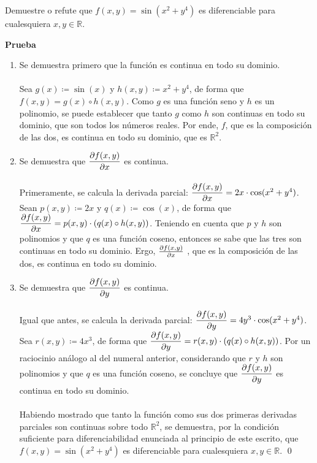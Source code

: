 \documentclass{fmbvecto}
\begin{document}
\begin{problema}

Demuestre o refute que \(f(x, y) = \sin(x^2+y^4)\) es diferenciable para cualesquiera \(x, y \in \mathbb{R}\).

\tcblower

\textbf{Prueba}\\

\begin{enumerate}
    \item Se demuestra primero que la función es continua en todo su dominio. \\\\ Sea \(g(x) \coloneqq \sin(x)\) y \(h(x, y) \coloneqq x^2+y^4\), de forma que \(f(x, y) = g(x) \circ h(x, y)\). Como \(g\) es una función seno y \(h\) es un polinomio, se puede establecer que tanto \(g\) como \(h\) son continuas en todo su dominio, que son todos los números reales. Por ende, \(f\), que es la composición de las dos, es continua en todo su dominio, que es \(\mathbb{R}^2\).\\
    
    \item Se demuestra que \(\dparder[f(x, y)]\) es continua. \\\\ Primeramente, se calcula la derivada parcial: \(\dparder[f(x, y)] = 2x \cdot \cos(x^2+y^4)\). Sean \(p(x, y) \coloneqq 2x\) y \(q(x) \coloneqq \cos(x)\), de forma que \(\dparder[f(x, y)] = p(x, y) \cdot (q(x) \circ h(x, y)) \). Teniendo en cuenta que \(p\) y \(h\) son polinomios y que \(q\) es una función coseno, entonces se sabe que las tres son continuas en todo su dominio. Ergo, \(\parder[f(x, y)]\) , que es la composición de las dos, es continua en todo su dominio.\\
    
    \item Se demuestra que \(\dparder[f(x, y)][y]\) es continua. \\\\  Igual que antes, se calcula la derivada parcial: \(\dparder[f(x, y)][y] = 4y^3 \cdot \cos(x^2+y^4)\). Sea \(r(x, y) \coloneqq 4x^3\), de forma que \(\dparder[f(x, y)][y] = r(x, y) \cdot (q(x) \circ h(x, y)) \). Por un raciocinio análogo al del numeral anterior, considerando que \(r\) y \(h\) son polinomios y que \(q\) es una función coseno, se concluye que \(\dparder[f(x, y)][y]\) es continua en todo su dominio.\\\\

    Habiendo mostrado que tanto la función como sus dos primeras derivadas parciales son continuas sobre todo \(\mathbb{R}^2\), se demuestra, por la condición suficiente para diferenciabilidad enunciada al principio de este escrito, que \(f(x, y) = \sin(x^2+y^4)\) es diferenciable para cualesquiera \(x, y \in \mathbb{R}\). 
    \qed
\end{enumerate}

\end{problema}
\end{document}

